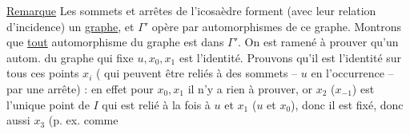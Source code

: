 \uline{Remarque} Les sommets et arrêtes de l'icosaèdre forment (avec leur relation d'incidence) un \uline{graphe}, et $\Gamma'$ opère par automorphismes de ce graphe. Montrons que \uline{tout} automorphisme  du graphe est dans $\Gamma'$. On est ramené à  prouver  qu'un autom. du graphe qui fixe $u,x_0,x_1$  est l'identité. Prouvons qu'il est l'identité sur tous ces points $x_i$ ( qui peuvent être reliés à  des sommets -- $u$ en l'occurrence -- par une arrête) : en effet  pour $x_0,x_1$ il n'y a rien à prouver, or $x_2$ ($x_{-1}$) est l'unique point de $I$  qui est relié  à la fois à $u$ et $x_1$ ($u$ et $x_0$), donc il est fixé, donc aussi $x_3$ (p. ex. comme
